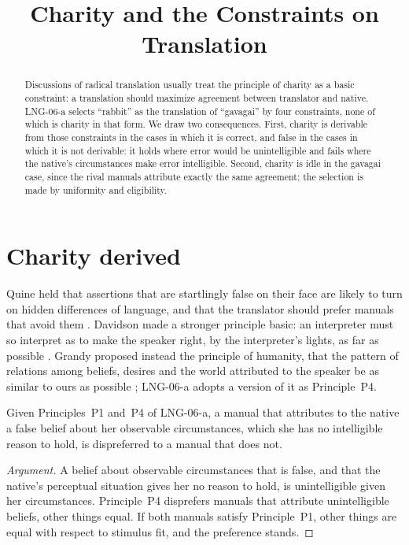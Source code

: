 \documentclass{situationist-preprint}
\title{Charity and the Constraints on Translation}
\begin{document}
\maketitle

\begin{abstract}
Discussions of radical translation usually treat the principle of charity as a basic constraint: a translation should maximize agreement between translator and native. LNG-06-a selects \enquote{rabbit} as the translation of \enquote{gavagai} by four constraints, none of which is charity in that form. We draw two consequences. First, charity is derivable from those constraints in the cases in which it is correct, and false in the cases in which it is not derivable: it holds where error would be unintelligible and fails where the native's circumstances make error intelligible. Second, charity is idle in the gavagai case, since the rival manuals attribute exactly the same agreement; the selection is made by uniformity and eligibility.
\end{abstract}

\section{Charity derived}

Quine held that assertions that are startlingly false on their face are likely to turn on hidden differences of language, and that the translator should prefer manuals that avoid them \citep{Quine1960}. Davidson made a stronger principle basic: an interpreter must so interpret as to make the speaker right, by the interpreter's lights, as far as possible \citep{Davidson1974}. Grandy proposed instead the principle of humanity, that the pattern of relations among beliefs, desires and the world attributed to the speaker be as similar to ours as possible \citep{Grandy1973}; LNG-06-a adopts a version of it as Principle~P4.

\begin{proposition}\label{p:charity}
Given Principles~P1 and~P4 of LNG-06-a, a manual that attributes to the native a false belief about her observable circumstances, which she has no intelligible reason to hold, is dispreferred to a manual that does not.
\end{proposition}

\begin{proof}[Argument]
A belief about observable circumstances that is false, and that the native's perceptual situation gives her no reason to hold, is unintelligible given her circumstances. Principle~P4 disprefers manuals that attribute unintelligible beliefs, other things equal. If both manuals satisfy Principle~P1, other things are equal with respect to stimulus fit, and the preference stands.
\end{proof}
\end{document}
